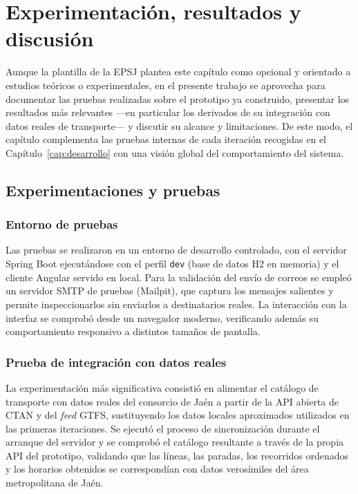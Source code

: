 \chapter{Experimentación, resultados y discusión}
\label{cap:experimentacion}

Aunque la plantilla de la EPSJ plantea este capítulo como opcional y orientado a estudios teóricos o experimentales, en el presente trabajo se aprovecha para documentar las pruebas realizadas sobre el prototipo ya construido, presentar los resultados más relevantes —en particular los derivados de su integración con datos reales de transporte— y discutir su alcance y limitaciones. De este modo, el capítulo complementa las pruebas internas de cada iteración recogidas en el Capítulo~\ref{cap:desarrollo} con una visión global del comportamiento del sistema.


\section{Experimentaciones y pruebas}
\label{sec:experimentaciones}

\subsection{Entorno de pruebas}

Las pruebas se realizaron en un entorno de desarrollo controlado, con el servidor Spring Boot ejecutándose con el perfil \texttt{dev} (base de datos H2 en memoria) y el cliente Angular servido en local. Para la validación del envío de correos se empleó un servidor SMTP de pruebas (Mailpit), que captura los mensajes salientes y permite inspeccionarlos sin enviarlos a destinatarios reales. La interacción con la interfaz se comprobó desde un navegador moderno, verificando además su comportamiento responsivo a distintos tamaños de pantalla.

\subsection{Prueba de integración con datos reales}

La experimentación más significativa consistió en alimentar el catálogo de transporte con datos reales del consorcio de Jaén a partir de la API abierta de CTAN y del \textit{feed} GTFS, sustituyendo los datos locales aproximados utilizados en las primeras iteraciones. Se ejecutó el proceso de sincronización durante el arranque del servidor y se comprobó el catálogo resultante a través de la propia API del prototipo, validando que las líneas, las paradas, los recorridos ordenados y los horarios obtenidos se correspondían con datos verosímiles del área metropolitana de Jaén.

